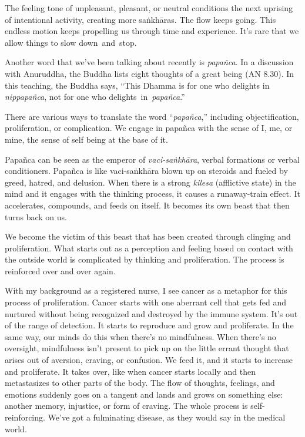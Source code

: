 The feeling tone of unpleasant, pleasant, or neutral conditions the next uprising of intentional activity, creating more saṅkhāras. The flow keeps going. This endless motion keeps propelling us through time and experience. It's rare that we allow things to slow \mbox{down and stop.}

Another word that we've been talking about recently is \emph{papañca}. In a discussion with Anuruddha, the Buddha lists eight thoughts of a great being (AN 8.30). In this teaching, the Buddha says, ``This Dhamma is for one who delights in \emph{nippapañca}, not for one who \mbox{delights in \emph{papañca}.''}

There are various ways to translate the word ``\emph{papañca},'' including objectification, proliferation, or complication. We engage in papañca with the sense of I, me, or mine, the sense of self being at the base of it.

Papañca can be seen as the emperor of \emph{vaci-saṅkhāra}, verbal formations or verbal conditioners. Papañca is like vaci-saṅkhāra blown up on steroids and fueled by greed, hatred, and delusion. When there is a strong \emph{kilesa} (afflictive state) in the mind and it engages with the thinking process, it causes a runaway-train effect. It accelerates, compounds, and feeds on itself. It becomes its own beast that then turns back on us.

We become the victim of this beast that has been created through clinging and proliferation. What starts out as a perception and feeling based on contact with the outside world is complicated by thinking and proliferation. The process is reinforced over and over again.

With my background as a registered nurse, I see cancer as a metaphor for this process of proliferation. Cancer starts with one aberrant cell that gets fed and nurtured without being recognized and destroyed by the immune system. It's out of the range of detection. It starts to reproduce and grow and proliferate. In the same way, our minds do this when there's no mindfulness. When there's no oversight, mindfulness isn't present to pick up on the little errant thought that arises out of aversion, craving, or confusion. We feed it, and it starts to increase and proliferate. It takes over, like when cancer starts locally and then metastasizes to other parts of the body. The flow of thoughts, feelings, and emotions suddenly goes on a tangent and lands and grows on something else: another memory, injustice, or form of craving. The whole process is self-reinforcing. We've got a fulminating disease, as they would say in the medical world.

